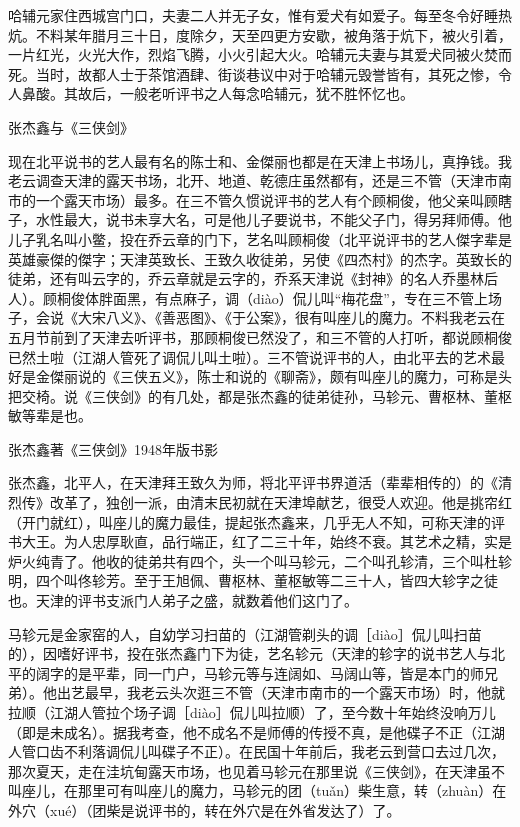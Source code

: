 \documentclass[12pt,UTF8]{ctexbook}
\begin{document}
哈辅元家住西城宫门口，夫妻二人并无子女，惟有爱犬有如爱子。每至冬令好睡热炕。不料某年腊月三十日，度除夕，天至四更方安歇，被角落于炕下，被火引着，一片红光，火光大作，烈焰飞腾，小火引起大火。哈辅元夫妻与其爱犬同被火焚而死。当时，故都人士于茶馆酒肆、街谈巷议中对于哈辅元毁誉皆有，其死之惨，令人鼻酸。其故后，一般老听评书之人每念哈辅元，犹不胜怀忆也。





张杰鑫与《三侠剑》


现在北平说书的艺人最有名的陈士和、金傑丽也都是在天津上书场儿，真挣钱。我老云调查天津的露天书场，北开、地道、乾德庄虽然都有，还是三不管（天津市南市的一个露天市场）最多。在三不管久惯说评书的艺人有个顾桐俊，他父亲叫顾瞎子，水性最大，说书未享大名，可是他儿子要说书，不能父子门，得另拜师傅。他儿子乳名叫小鳖，投在乔云章的门下，艺名叫顾桐俊（北平说评书的艺人傑字辈是英雄豪傑的傑字；天津英致长、王致久收徒弟，另使《四杰村》的杰字。英致长的徒弟，还有叫云字的，乔云章就是云字的，乔系天津说《封神》的名人乔墨林后人）。顾桐俊体胖面黑，有点麻子，调（diào）侃儿叫“梅花盘”，专在三不管上场子，会说《大宋八义》、《善恶图》、《于公案》，很有叫座儿的魔力。不料我老云在五月节前到了天津去听评书，那顾桐俊已然没了，和三不管的人打听，都说顾桐俊已然土啦（江湖人管死了调侃儿叫土啦）。三不管说评书的人，由北平去的艺术最好是金傑丽说的《三侠五义》，陈士和说的《聊斋》，颇有叫座儿的魔力，可称是头把交椅。说《三侠剑》的有几处，都是张杰鑫的徒弟徒孙，马轸元、曹枢林、董枢敏等辈是也。

张杰鑫著《三侠剑》1948年版书影



张杰鑫，北平人，在天津拜王致久为师，将北平评书界道活（辈辈相传的）的《清烈传》改革了，独创一派，由清末民初就在天津埠献艺，很受人欢迎。他是挑帘红（开门就红），叫座儿的魔力最佳，提起张杰鑫来，几乎无人不知，可称天津的评书大王。为人忠厚耿直，品行端正，红了二三十年，始终不衰。其艺术之精，实是炉火纯青了。他收的徒弟共有四个，头一个叫马轸元，二个叫孔轸清，三个叫杜轸明，四个叫佟轸芳。至于王旭佩、曹枢林、董枢敏等二三十人，皆四大轸字之徒也。天津的评书支派门人弟子之盛，就数着他们这门了。

马轸元是金家窑的人，自幼学习扫苗的（江湖管剃头的调［diào］侃儿叫扫苗的），因嗜好评书，投在张杰鑫门下为徒，艺名轸元（天津的轸字的说书艺人与北平的阔字的是平辈，同一门户，马轸元等与连阔如、马阔山等，皆是本门的师兄弟）。他出艺最早，我老云头次逛三不管（天津市南市的一个露天市场）时，他就拉顺（江湖人管拉个场子调［diào］侃儿叫拉顺）了，至今数十年始终没响万儿（即是未成名）。据我考查，他不成名不是师傅的传授不真，是他碟子不正（江湖人管口齿不利落调侃儿叫碟子不正）。在民国十年前后，我老云到营口去过几次，那次夏天，走在洼坑甸露天市场，也见着马轸元在那里说《三侠剑》，在天津虽不叫座儿，在那里可有叫座儿的魔力，马轸元的团（tuǎn）柴生意，转（zhuàn）在外穴（xué）（团柴是说评书的，转在外穴是在外省发达了）了。
\end{document}
